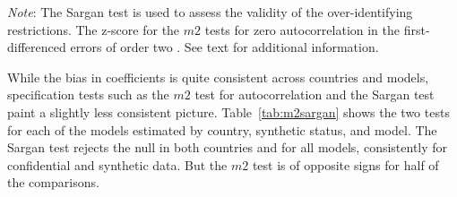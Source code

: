 \documentclass[10pt]{article}
\begin{document}
\begin{table}[!htbp] \centering 
  \caption{m2 and Sargan tests by country} 
  \label{tab:m2sargan} 
\begin{tablenotes}\footnotesize \item 
\textit{Note}: The Sargan test \parencite{blundell_estimation_2001,RePEc:oup:restud:v:58:y:1991:i:2:p:277-297.} is used to assess the validity of the over-identifying restrictions. The z-score for the $m2$ tests for zero autocorrelation in the  first-differenced errors of order two \parencite{RePEc:oup:restud:v:58:y:1991:i:2:p:277-297.}. See text for additional information.
\end{tablenotes}

\end{table} 
 

While the bias in coefficients is quite consistent across countries and models, specification tests such as  the $m2$ test for autocorrelation and the Sargan test paint a slightly less consistent picture. Table~\ref{tab:m2sargan} shows the two tests for each of the models estimated by country, synthetic status, and model. The Sargan test rejects the null in both countries and for all models, consistently for confidential and synthetic data. But the $m2$ test is of opposite signs for half of the comparisons. 
\end{document}

